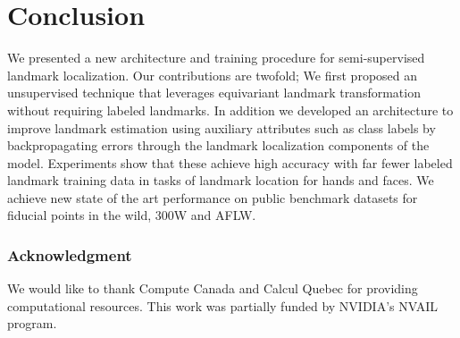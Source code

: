 \documentclass[10pt,twocolumn,letterpaper]{article}
\begin{document}
\section{Conclusion}
We presented a new architecture and training procedure for semi-supervised landmark localization. Our contributions are twofold;
We first proposed an unsupervised technique that leverages equivariant landmark transformation without requiring labeled landmarks. 
In addition we developed an architecture to improve landmark estimation using auxiliary attributes such as class labels by backpropagating errors through the landmark localization components of the model.
Experiments show that these achieve high accuracy with far fewer labeled landmark training data in tasks of landmark location for hands and faces. We achieve new state of the art performance on public benchmark datasets for fiducial points in the wild, 300W and AFLW. 
\vspace*{-0.2cm}\subsubsection*{Acknowledgment}\vspace*{-0.1cm}
We would like to thank Compute Canada and Calcul Quebec for providing computational resources. This work was partially funded by NVIDIA’s NVAIL program.

{\small


}
\end{document}

